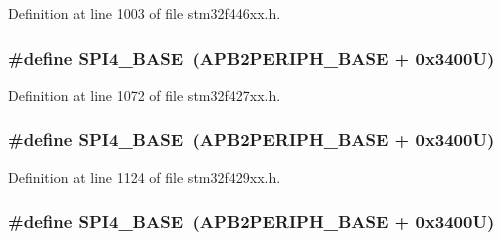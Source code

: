 Definition at line 1003 of file stm32f446xx.\+h.

\subsubsection[{\texorpdfstring{S\+P\+I4\+\_\+\+B\+A\+SE}{SPI4_BASE}}]{\setlength{\rightskip}{0pt plus 5cm}\#define S\+P\+I4\+\_\+\+B\+A\+SE~({\bf A\+P\+B2\+P\+E\+R\+I\+P\+H\+\_\+\+B\+A\+SE} + 0x3400\+U)}\hypertarget{group___peripheral__memory__map_gac5cfaedf263cee1e79554665f921c708}{}\label{group___peripheral__memory__map_gac5cfaedf263cee1e79554665f921c708}


Definition at line 1072 of file stm32f427xx.\+h.

\subsubsection[{\texorpdfstring{S\+P\+I4\+\_\+\+B\+A\+SE}{SPI4_BASE}}]{\setlength{\rightskip}{0pt plus 5cm}\#define S\+P\+I4\+\_\+\+B\+A\+SE~({\bf A\+P\+B2\+P\+E\+R\+I\+P\+H\+\_\+\+B\+A\+SE} + 0x3400\+U)}\hypertarget{group___peripheral__memory__map_gac5cfaedf263cee1e79554665f921c708}{}\label{group___peripheral__memory__map_gac5cfaedf263cee1e79554665f921c708}


Definition at line 1124 of file stm32f429xx.\+h.

\subsubsection[{\texorpdfstring{S\+P\+I4\+\_\+\+B\+A\+SE}{SPI4_BASE}}]{\setlength{\rightskip}{0pt plus 5cm}\#define S\+P\+I4\+\_\+\+B\+A\+SE~({\bf A\+P\+B2\+P\+E\+R\+I\+P\+H\+\_\+\+B\+A\+SE} + 0x3400\+U)}\hypertarget{group___peripheral__memory__map_gac5cfaedf263cee1e79554665f921c708}{}\label{group___peripheral__memory__map_gac5cfaedf263cee1e79554665f921c708}


